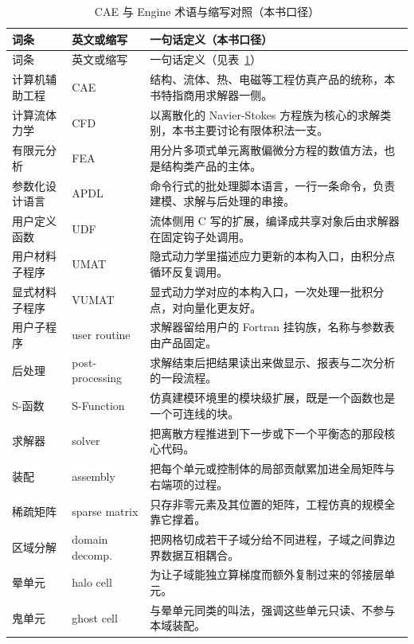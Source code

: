 \documentclass[12pt,a4paper,fontset=fandol]{ctexbook}
\newcommand{\Lang}[1]{\textsf{#1}}
\newcommand{\CL}{\Lang{C}}
\newcommand{\DomCAE}{\Lang{CAE}}
\newcommand{\DomEngine}{\Lang{Engine}}
\begin{document}
\footnotesize
\begin{longtable}{>{\raggedright\arraybackslash}p{}>{\raggedright\arraybackslash}p{}>{\raggedright\arraybackslash}p{}}
\caption{\DomCAE{} 与 \DomEngine{} 术语与缩写对照（本书口径）}\label{tab:apA-glossary}\\
\toprule
词条 & 英文或缩写 & 一句话定义（本书口径） \\
\midrule
\endfirsthead
\toprule
词条 & 英文或缩写 & 一句话定义（见表~\ref{tab:apA-glossary}） \\
\midrule
\endhead
\endfoot
\bottomrule
\endlastfoot
计算机辅助工程 & CAE & 结构、流体、热、电磁等工程仿真产品的统称，本书特指商用求解器一侧。 \\
计算流体力学 & CFD & 以离散化的 Navier-Stokes 方程族为核心的求解类别，本书主要讨论有限体积法一支。 \\
有限元分析 & FEA & 用分片多项式单元离散偏微分方程的数值方法，也是结构类产品的主体。 \\
参数化设计语言 & APDL & 命令行式的批处理脚本语言，一行一条命令，负责建模、求解与后处理的串接。 \\
用户定义函数 & UDF & 流体侧用 \CL{} 写的扩展，编译成共享对象后由求解器在固定钩子处调用。 \\
用户材料子程序 & UMAT & 隐式动力学里描述应力更新的本构入口，由积分点循环反复调用。 \\
显式材料子程序 & VUMAT & 显式动力学对应的本构入口，一次处理一批积分点，对向量化更友好。 \\
用户子程序 & user routine & 求解器留给用户的 Fortran 挂钩族，名称与参数表由产品固定。 \\
后处理 & post-processing & 求解结束后把结果读出来做显示、报表与二次分析的一段流程。 \\
S-函数 & S-Function & 仿真建模环境里的模块级扩展，既是一个函数也是一个可连线的块。 \\
求解器 & solver & 把离散方程推进到下一步或下一个平衡态的那段核心代码。 \\
装配 & assembly & 把每个单元或控制体的局部贡献累加进全局矩阵与右端项的过程。 \\
稀疏矩阵 & sparse matrix & 只存非零元素及其位置的矩阵，工程仿真的规模全靠它撑着。 \\
区域分解 & domain decomp. & 把网格切成若干子域分给不同进程，子域之间靠边界数据互相耦合。 \\
晕单元 & halo cell & 为让子域能独立算梯度而额外复制过来的邻接层单元。 \\
鬼单元 & ghost cell & 与晕单元同类的叫法，强调这些单元只读、不参与本域装配。 \\

\end{longtable}
\end{document}
